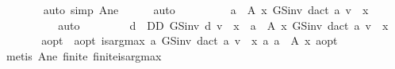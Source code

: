 \begin{isabellebody}
\ \ \ \ \ \ \isamarkupfalse%
\ {\isacharparenleft}{\kern0pt}auto\ simp{\isacharcolon}{\kern0pt}\ A{\isacharunderscore}{\kern0pt}ne{\isacharparenright}{\kern0pt}\isanewline
\ \ \ \ \isamarkupfalse%
\ auto\isanewline
\ \ \ \ \isamarkupfalse%
\ \isamarkupfalse%
\ {\isachardoublequoteopen}{\isasymdots}\ {\isacharequal}{\kern0pt}\ {\isacharparenleft}{\kern0pt}{\isasymSqunion}a\ {\isasymin}\ A\ x{\isachardot}{\kern0pt}\ GS{\isacharunderscore}{\kern0pt}inv\ {\isacharparenleft}{\kern0pt}d{\isacharunderscore}{\kern0pt}act\ a{\isacharparenright}{\kern0pt}\ v\ {\isachardollar}{\kern0pt}\ x{\isacharparenright}{\kern0pt}{\isachardoublequoteclose}\isanewline
\ \ \ \ \ \ \isamarkupfalse%
\ {}\ \isamarkupfalse%
\ auto\isanewline
\ \ \ \ \isamarkupfalse%
\ \isamarkupfalse%
\ {\isacharasterisk}{\kern0pt}{\isacharcolon}{\kern0pt}\ {\isachardoublequoteopen}{\isacharparenleft}{\kern0pt}{\isasymSqunion}d\ {\isasymin}\ D\isactrlsub D{\isachardot}{\kern0pt}\ GS{\isacharunderscore}{\kern0pt}inv\ d\ v\ {\isachardollar}{\kern0pt}\ x{\isacharparenright}{\kern0pt}\ {\isacharequal}{\kern0pt}\ {\isacharparenleft}{\kern0pt}{\isasymSqunion}a\ {\isasymin}\ A\ x{\isachardot}{\kern0pt}\ GS{\isacharunderscore}{\kern0pt}inv\ {\isacharparenleft}{\kern0pt}d{\isacharunderscore}{\kern0pt}act\ a{\isacharparenright}{\kern0pt}\ v\ {\isachardollar}{\kern0pt}\ x{\isacharparenright}{\kern0pt}{\isachardoublequoteclose}\isacommand{{\isachardot}{\kern0pt}}\isamarkupfalse%
\isanewline
\ \ \ \ \isamarkupfalse%
\ \isamarkupfalse%
\ a{\isacharunderscore}{\kern0pt}opt\ \ a{\isacharunderscore}{\kern0pt}opt{\isacharcolon}{\kern0pt}\ {\isachardoublequoteopen}is{\isacharunderscore}{\kern0pt}arg{\isacharunderscore}{\kern0pt}max\ {\isacharparenleft}{\kern0pt}{\isasymlambda}a{\isachardot}{\kern0pt}\ GS{\isacharunderscore}{\kern0pt}inv\ {\isacharparenleft}{\kern0pt}d{\isacharunderscore}{\kern0pt}act\ a{\isacharparenright}{\kern0pt}\ v\ {\isachardollar}{\kern0pt}\ x{\isacharparenright}{\kern0pt}\ {\isacharparenleft}{\kern0pt}{\isasymlambda}a{\isachardot}{\kern0pt}\ a\ {\isasymin}\ A\ x{\isacharparenright}{\kern0pt}\ a{\isacharunderscore}{\kern0pt}opt{\isachardoublequoteclose}\isanewline
\ \ \ \ \ \ \isamarkupfalse%
\ {\isacharparenleft}{\kern0pt}metis\ A{\isacharunderscore}{\kern0pt}ne\ finite\ finite{\isacharunderscore}{\kern0pt}is{\isacharunderscore}{\kern0pt}arg{\isacharunderscore}{\kern0pt}max{\isacharparenright}{\kern0pt}\isanewline

\end{isabellebody}
